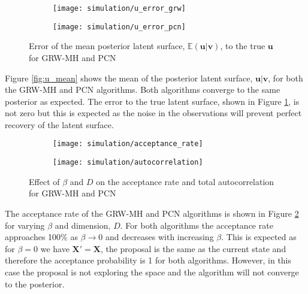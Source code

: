 \documentclass[11pt]{article}
\begin{document}
\begin{figure}
    \centering
    \begin{subfigure}{0.45\textwidth}
        \texttt{[image: simulation/u\_error\_grw]}
    \end{subfigure}
    \begin{subfigure}{0.45\textwidth}
        \texttt{[image: simulation/u\_error\_pcn]}
    \end{subfigure}
    \caption{Error of the mean posterior latent surface, $\mathbb{E}(\boldsymbol{u} | \boldsymbol{v})$, to the true $\boldsymbol{u}$ for GRW-MH and PCN}
    \label{fig:u_error}
\end{figure}

Figure \ref{fig:u_mean} shows the mean of the posterior latent surface, $\boldsymbol{u} | \boldsymbol{v}$, for both the GRW-MH and PCN algorithms. Both algorithms converge to the same posterior as expected. The error to the true latent surface, shown in Figure \ref{fig:u_error}, is not zero but this is expected as the noise in the observations will prevent perfect recovery of the latent surface.

\begin{figure}
    \centering
    \begin{subfigure}{0.45\textwidth}
        \texttt{[image: simulation/acceptance\_rate]}
        \label{fig:acceptance_rate}
    \end{subfigure}
    \begin{subfigure}{0.45\textwidth}
        \texttt{[image: simulation/autocorrelation]}
        \label{fig:autocorrelation}
    \end{subfigure}
    \caption{Effect of $\beta$ and $D$ on the acceptance rate and total autocorrelation for GRW-MH and PCN}
\end{figure}

The acceptance rate of the GRW-MH and PCN algorithms is shown in Figure \ref{fig:acceptance_rate} for varying $\beta$ and dimension, $D$. For both algorithms the acceptance rate approaches 100\% as $\beta \to 0$ and decreases with increasing $\beta$. This is expected as for $\beta = 0$ we have $\boldsymbol{X}' = \boldsymbol{X}$, the proposal is the same as the current state and therefore the acceptance  probability is 1 for both algorithms. However, in this case the proposal is not exploring the space and the algorithm will not converge to the posterior. 
\end{document}
